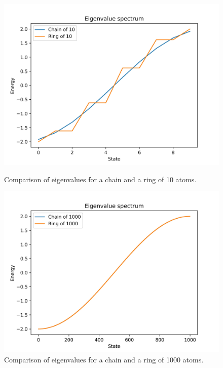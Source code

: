 \documentclass[twocolumn]{article}
\begin{document}
\begin{figure}[ht]
    \centering
    \begin{minipage}{0.47\textwidth}
        \centering
        \includegraphics[width=\textwidth]{Figures/chain_vs_ring.jpg}
        \caption{Comparison of eigenvalues for a chain and a ring of 10 atoms.}
        \label{fig:chain_ring}
    \end{minipage}
    \hfill
    \begin{minipage}{0.47\textwidth}
        \centering
        \includegraphics[width=\textwidth]{Figures/convergence_limit.jpg}
        \caption{Comparison of eigenvalues for a chain and a ring of 1000 atoms.}
        \label{fig:chain_vs_ring_infinite}
    \end{minipage}
\end{figure}
\end{document}
